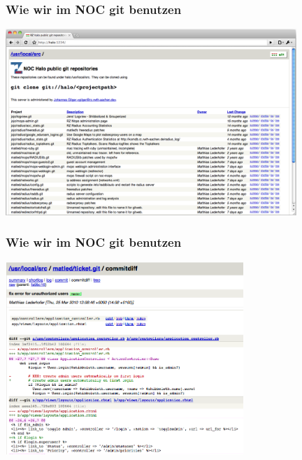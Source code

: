 \begin{frame}
  \frametitle{Wie wir im NOC git benutzen}
  \vspace{-0.8cm}
  \begin{center}
    \includegraphics[width=11cm]{img/git_halo.png}
  \end{center}
\end{frame}

\begin{frame}
  \frametitle{Wie wir im NOC git benutzen}
  \vspace{-0.3cm}
  \begin{center}
    \includegraphics[width=9cm]{img/git_diff_halo.png}
  \end{center}
\end{frame}

